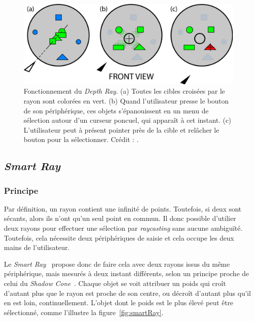 	\begin{figure}[!htb]
		\centering
		\includegraphics[width=\rayWidth]{figures/ch2/flowerRay}
		\caption[Principe du \emph{Flower Ray}]{Fonctionnement du \emph{Depth Ray}. (a) Toutes les cibles croisées par le rayon sont colorées en vert. (b) Quand l'utilisateur presse le bouton de son périphérique, ces objets s'épanouissent en un menu de sélection autour d'un curseur poncuel, qui apparaît à cet instant. (c) L'utilisateur peut à présent pointer près de la cible et relâcher le bouton pour la sélectionner. Crédit : \cite{grossman2006design}.}
		\label{fig:flowerRay}
	\end{figure}
	
	\subsection{\emph{Smart Ray}}
	\subsubsection{Principe}
	Par définition, un rayon contient une infinité de points. Toutefois, si deux sont sécants, alors ils n'ont qu'un seul point en commun. Il donc possible d'utilier deux rayons pour effectuer une sélection par \emph{raycasting} sans aucune ambiguïté. Toutefois, cela nécessite deux périphériques de saisie et cela occupe les deux mains de l'utilisateur.
	
	Le \emph{Smart Ray}~\cite{grossman2006design} propose donc de faire cela avec deux rayons issus du même périphérique, mais mesurés à deux instant différents, selon un principe proche de celui du \emph{Shadow Cone}~\cite{steed20043d}. Chaque objet se voit attribuer un \og poids \fg{} qui croît d'autant plus que le rayon est proche de son centre, ou décroît d'autant plus qu'il en est loin, continuellement. L'objet dont le poids est le plus élevé peut être sélectionné, comme l'illustre la figure~\ref{fig:smartRay}.
	
